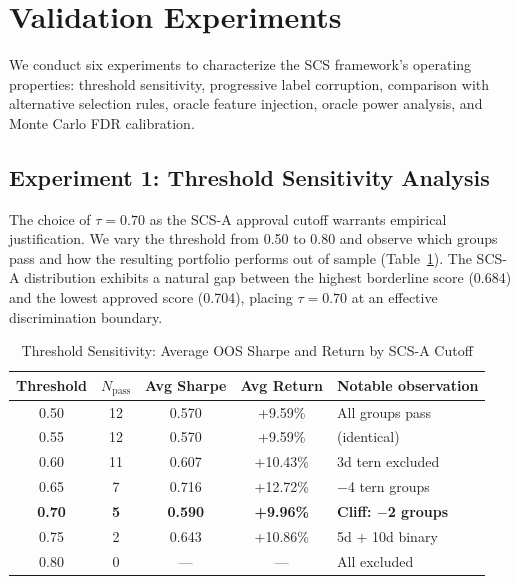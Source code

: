 \documentclass[12pt,a4paper]{article}
\begin{document}
\section{Validation Experiments}
\label{sec:experiments}

We conduct six experiments to characterize the SCS framework's operating properties: threshold sensitivity, progressive label corruption, comparison with alternative selection rules, oracle feature injection, oracle power analysis, and Monte Carlo FDR calibration.

\subsection{Experiment 1: Threshold Sensitivity Analysis}
\label{sec:threshold}

The choice of $\tau=0.70$ as the SCS-A approval cutoff warrants empirical justification. We vary the threshold from 0.50 to 0.80 and observe which groups pass and how the resulting portfolio performs out of sample (Table~\ref{tab:threshold}). The SCS-A distribution exhibits a natural gap between the highest borderline score (0.684) and the lowest approved score (0.704), placing $\tau=0.70$ at an effective discrimination boundary.

\begin{table}[H]
\centering
\caption{Threshold Sensitivity: Average OOS Sharpe and Return by SCS-A Cutoff\protect\footnotemark}
\label{tab:threshold}
\begin{tabular}{ccccl}
\toprule
Threshold & $N_{\text{pass}}$ & Avg Sharpe & Avg Return & Notable observation \\
\midrule
0.50 & 12 & 0.570 & +9.59\% & All groups pass \\
0.55 & 12 & 0.570 & +9.59\% & (identical) \\
0.60 & 11 & 0.607 & +10.43\% & 3d tern excluded \\
0.65 & 7 & 0.716 & +12.72\% & $-$4 tern groups \\
\textbf{0.70} & \textbf{5} & \textbf{0.590} & \textbf{+9.96\%} & \textbf{Cliff: $-$2 groups} \\
0.75 & 2 & 0.643 & +10.86\% & 5d + 10d binary \\
0.80 & 0 & --- & --- & All excluded \\
\bottomrule
\end{tabular}
\end{table}

\end{document}
